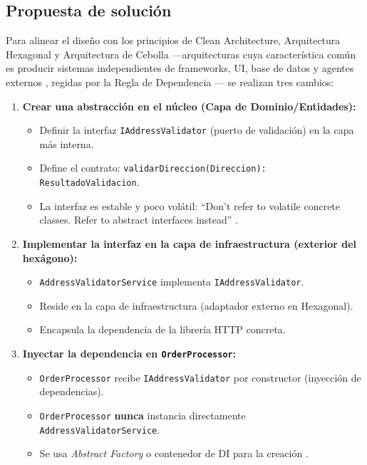 \subsection*{Propuesta de solución}

Para alinear el diseño con los principios de Clean Architecture, Arquitectura Hexagonal y Arquitectura de Cebolla —arquitecturas cuya característica común es producir sistemas independientes de frameworks, UI, base de datos y agentes externos , regidas por la Regla de Dependencia — se realizan tres cambios:

\begin{enumerate}
    \item \textbf{Crear una abstracción en el núcleo (Capa de Dominio/Entidades):}
    \begin{itemize}
        \item Definir la interfaz \texttt{IAddressValidator} (puerto de validación) en la capa más interna.
        \item Define el contrato: \texttt{validarDireccion(Direccion): ResultadoValidacion}.
        \item La interfaz es estable y poco volátil: \enquote{Don't refer to volatile concrete classes. Refer to abstract interfaces instead} .
    \end{itemize}

    \item \textbf{Implementar la interfaz en la capa de infraestructura (exterior del hexágono):}
    \begin{itemize}
        \item \texttt{AddressValidatorService} implementa \texttt{IAddressValidator}.
        \item Reside en la capa de infraestructura (adaptador externo en Hexagonal).
        \item Encapsula la dependencia de la librería HTTP concreta.
    \end{itemize}

    \item \textbf{Inyectar la dependencia en \texttt{OrderProcessor}:}
    \begin{itemize}
        \item \texttt{OrderProcessor} recibe \texttt{IAddressValidator} por constructor (inyección de dependencias).
        \item \texttt{OrderProcessor} \textbf{nunca} instancia directamente \texttt{AddressValidatorService}.
        \item Se usa \textit{Abstract Factory} o contenedor de DI para la creación .
    \end{itemize}
\end{enumerate}

